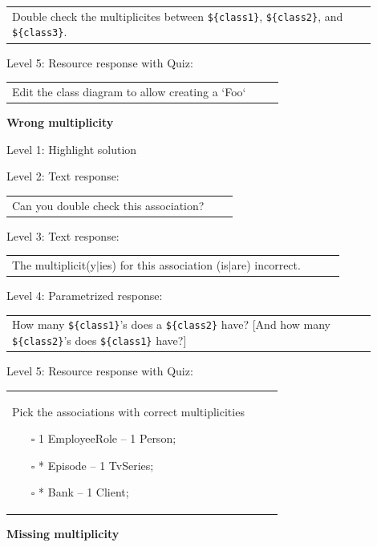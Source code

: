 \begin{tabular}{|p{0.9\linewidth}}
Double check the multiplicites between \verb|${class1}|, \verb|${class2}|, and \verb|${class3}|.
\end{tabular} \medskip

\noindent Level 5: Resource response with Quiz: \medskip

\begin{tabular}{|p{0.9\linewidth}}
Edit the class diagram to allow creating a `Foo`
\end{tabular} \medskip


\noindent \textbf{Wrong multiplicity} \medskip

\noindent Level 1: Highlight solution \medskip

\noindent Level 2: Text response: \medskip

\begin{tabular}{|p{0.9\linewidth}}
Can you double check this association?
\end{tabular} \medskip

\noindent Level 3: Text response: \medskip

\begin{tabular}{|p{0.9\linewidth}}
The multiplicit(y$|$ies) for this association (is$|$are) incorrect.
\end{tabular} \medskip

\noindent Level 4: Parametrized response: \medskip

\begin{tabular}{|p{0.9\linewidth}}
How many \verb|${class1}|'s does a \verb|${class2}| have? [And how many \verb|${class2}|'s does \verb|${class1}| have?]
\end{tabular} \medskip

\noindent Level 5: Resource response with Quiz: \medskip

\begin{tabular}{|p{0.9\linewidth}}
Pick the associations with correct multiplicities

\begin{itemize}
    \item[$\square$] 1 EmployeeRole -- 1 Person;
    \item[$\square$] * Episode -- 1 TvSeries;
    \item[$\square$] * Bank -- 1 Client;
\end{itemize}

\end{tabular} \medskip


\noindent \textbf{Missing multiplicity} \medskip

